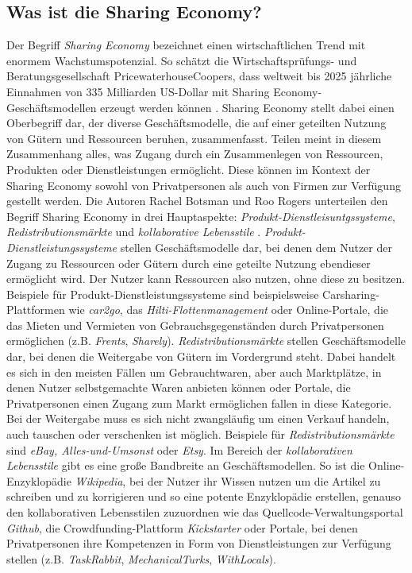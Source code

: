 \documentclass[a4paper]{scrartcl}
\begin{document}
\begin{multicols}{2}
		\subsection{Was ist die Sharing Economy?}
			Der Begriff  \textit{Sharing Economy} bezeichnet einen wirtschaftlichen Trend mit enormem Wachstumspotenzial. So sch\"atzt die Wirtschaftspr\"ufungs- und Beratungsgesellschaft PricewaterhouseCoopers, dass weltweit bis 2025 j\"ahrliche Einnahmen von 335 Milliarden US-Dollar mit Sharing Economy-Gesch\"aftsmodellen erzeugt werden k\"onnen \cite{matzler2014}. Sharing Economy stellt dabei einen Oberbegriff dar, der diverse Gesch\"aftsmodelle, die auf einer geteilten Nutzung von G\"utern und Ressourcen beruhen, zusammenfasst. Teilen meint in diesem Zusammenhang alles, was Zugang durch ein Zusammenlegen von Ressourcen, Produkten oder Dienstleistungen erm\"oglicht. Diese k\"onnen im Kontext der Sharing Economy sowohl von Privatpersonen als auch von Firmen zur Verf\"ugung gestellt werden. Die Autoren Rachel Botsman und Roo Rogers unterteilen den Begriff Sharing Economy in drei Hauptaspekte: \textit{Produkt-Dienstleisuntgssysteme}, \textit{Redistributionsm\"arkte} und \textit{kollaborative Lebensstile} \cite{matzler2014}.
			\textit{Produkt-Dienstleistungssysteme} stellen Gesch\"aftsmodelle dar, bei denen dem Nutzer der Zugang zu Ressourcen oder G\"utern durch eine geteilte Nutzung ebendieser erm\"oglicht wird. Der Nutzer kann Ressourcen also nutzen, ohne diese zu besitzen. Beispiele f\"ur Produkt-Dienstleistungssysteme sind beispielsweise Carsharing-Plattformen wie \textit{car2go}, das \textit{Hilti-Flottenmanagement} oder Online-Portale, die das Mieten und Vermieten von Gebrauchsgegenst\"anden durch Privatpersonen erm\"oglichen (z.B. \textit{Frents}, \textit{Sharely}).
			\textit{Redistributionsm\"arkte} stellen Gesch\"aftsmodelle dar, bei denen die Weitergabe von G\"utern im Vordergrund steht. Dabei handelt es sich in den meisten F\"allen um Gebrauchtwaren, aber auch Marktpl\"atze, in denen Nutzer selbstgemachte Waren anbieten k\"onnen oder Portale, die Privatpersonen einen Zugang zum Markt erm\"oglichen fallen in diese Kategorie. Bei der Weitergabe muss es sich nicht zwangsl\"aufig um einen Verkauf handeln, auch tauschen oder verschenken ist m\"oglich. Beispiele f\"ur \textit{Redistributionsm\"arkte} sind \textit{eBay, Alles-und-Umsonst} oder \textit{Etsy}.
			Im Bereich der \textit{kollaborativen Lebensstile} gibt es eine gro\ss e Bandbreite an Gesch\"aftsmodellen. So ist die Online-Enzyklop\"adie \textit{Wikipedia}, bei der Nutzer ihr Wissen nutzen um die Artikel zu schreiben und zu korrigieren und so eine potente Enzyklop\"adie erstellen, genauso den kollaborativen Lebensstilen zuzuordnen wie das Quellcode-Verwaltungsportal \textit{Github}, die Crowdfunding-Plattform \textit{Kickstarter} oder Portale, bei denen Privatpersonen ihre Kompetenzen in Form von Dienstleistungen zur Verf\"ugung stellen (z.B. \textit{TaskRabbit}, \textit{MechanicalTurks}, \textit{WithLocals}).\newline

\end{multicols}
\end{document}
